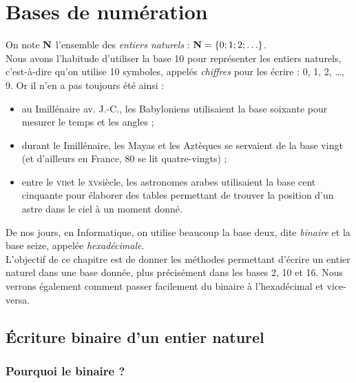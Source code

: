 \chapter{Bases de numération}


On note $\mathbf{N}$ l'ensemble des \textit{entiers naturels} : $\mathbf{N}=\lbrace 0;1;2;\ldots\rbrace$.\\

Nous avons l'habitude d'utiliser la base 10 pour représenter les entiers naturels, c'est-à-dire qu'on utilise 10 symboles, appelés \textit{chiffres}
pour les écrire : 0, 1, 2, \ldots, 9.
Or il n'en a pas toujours été ainsi :
\begin{itemize}
    \item 	au \textsc{I}\er millénaire av. J.-C., les Babyloniens utilisaient la base soixante pour mesurer le temps et les angles ;
    \item 	durant le \textsc{I}\er millénaire, les Mayas et les Aztèques se servaient de la base vingt (et d'ailleurs en France, 80 se lit \og
          quatre-vingts\fg) ;
    \item 	entre le \textsc{vii}\eme et le \textsc{xv}\eme siècle, les astronomes arabes utilisaient la base cent cinquante pour élaborer des tables
          permettant de trouver la position d'un astre dans le ciel à un moment donné.
\end{itemize}
De nos jours, en Informatique, on utilise beaucoup la base deux, dite \textit{binaire} et la base seize, appelée \textit{hexadécimale}.\\
L'objectif de ce chapitre est de donner les méthodes permettant d'écrire un entier naturel dans une base donnée, plus précisément dans les bases 2,
10 et 16. Nous verrons également comment passer facilement du binaire à l'hexadécimal et vice-versa.

\section{\'Ecriture binaire d'un entier naturel}
\subsection{Pourquoi le binaire ?}


